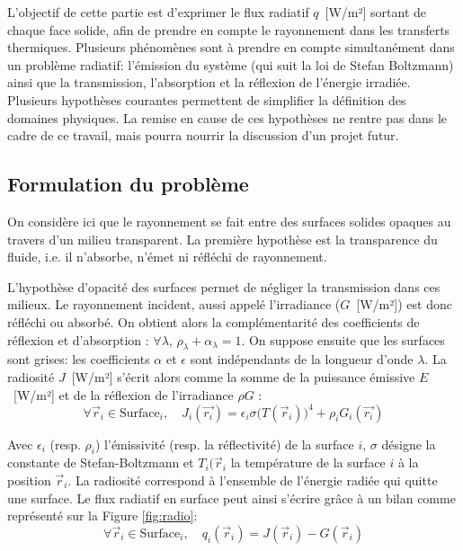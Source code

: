 
L'objectif de cette partie est d'exprimer le flux radiatif $q$~[W/m²] sortant de chaque face solide, afin de prendre en compte le rayonnement dans les transferts thermiques. Plusieurs phénomènes sont à prendre en compte simultanément dans un problème radiatif: l'émission du système (qui suit la loi de Stefan Boltzmann) ainsi que la transmission, l'absorption et la réflexion de l'énergie irradiée. Plusieurs hypothèses courantes permettent de simplifier la définition des domaines physiques. La remise en cause de ces hypothèses ne rentre pas dans le cadre de ce travail, mais pourra nourrir la discussion d'un projet futur.


\subsection{Formulation du problème}
On considère ici que le rayonnement se fait entre des surfaces solides opaques au travers d'un milieu transparent. La première hypothèse est la transparence du fluide, i.e. il n'absorbe, n'émet ni réfléchi de rayonnement.


L'hypothèse d'opacité des surfaces permet de négliger la transmission dans ces milieux. Le rayonnement incident, aussi appelé l'irradiance ($G$~[W/m²]) est donc réfléchi ou absorbé. On obtient alors la complémentarité des coefficients de réflexion et d'absorption : $\forall \lambda, \, \rho_{\lambda} + \alpha_{\lambda} = 1$. On suppose ensuite que les surfaces sont grises: les coefficients $\alpha$ et $\epsilon$ sont indépendants de la longueur d'onde $\lambda$. La radiosité $J$~[W/m²] s'écrit alors comme la somme de la puissance émissive $E$~[W/m²] et de la réflexion de l'irradiance $\rho G$ : 
\begin{equation}
    \forall \vec{r}_i \in \text{Surface}_i, \quad J_i(\vec{r_i}) = \epsilon_i \sigma \big(T(\vec{r}_i)\big)^4 + \rho_i G_i(\vec{r_i})
\label{def:radiosite}
\end{equation} 

Avec $\epsilon_i$ (resp. $\rho_i$) l’émissivité (resp. la réflectivité) de la surface $i$, $\sigma$ désigne la constante de Stefan-Boltzmann et $T_i(\vec{r}_i$ la température de la surface $i$ à la position $\vec{r}_i$. La radiosité correspond à l'ensemble de l'énergie radiée qui quitte une surface. Le flux radiatif en surface peut ainsi s'écrire grâce à un  bilan comme représenté sur la Figure \ref{fig:radio}:
\begin{equation}
    \forall \vec{r}_i \in \text{Surface}_i,\quad q_i(\vec{r}_i) =  J(\vec{r}_i)  - G(\vec{r}_i) 
    \label{eq:qr}
\end{equation}

